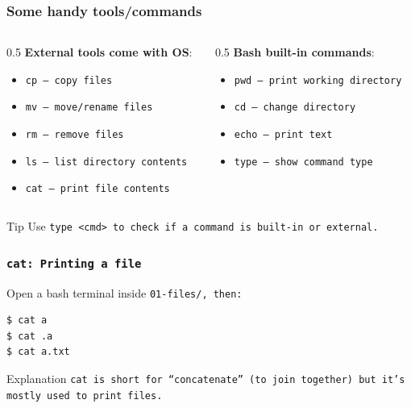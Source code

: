 \begin{frame}[fragile]
\frametitle{Some handy tools/commands}
\begin{columns}
\begin{column}{0.5\textwidth}
\textbf{External tools come with OS}:
\begin{itemize}
    \item \tt{cp} — copy files
    \item \tt{mv} — move/rename files
    \item \tt{rm} — remove files
    \item \tt{ls} — list directory contents
    \item \tt{cat} — print file contents
\end{itemize}
\end{column}
\begin{column}{0.5\textwidth}
\textbf{Bash built-in commands}:
\begin{itemize}
    \item \tt{pwd} — print working directory
    \item \tt{cd} — change directory
    \item \tt{echo} — print text
    \item \tt{type} — show command type
\end{itemize}
\end{column}
\end{columns}
\vspace{0.5em}
\begin{block}{Tip}
    Use \tt{type <cmd>} to check if a command is built-in or external.
\end{block}
\end{frame}

\begin{frame}[fragile]
\frametitle{\tt{cat}: Printing a file}
Open a bash terminal inside \tt{01-files/}, then:
\begin{lstlisting}[language=bash]
$ cat a
$ cat .a
$ cat a.txt
\end{lstlisting}
\begin{block}{Explanation}
    \tt{cat} is short for ``concatenate'' (to join together) but it's
    mostly used to print files.
\end{block}
\end{frame}


